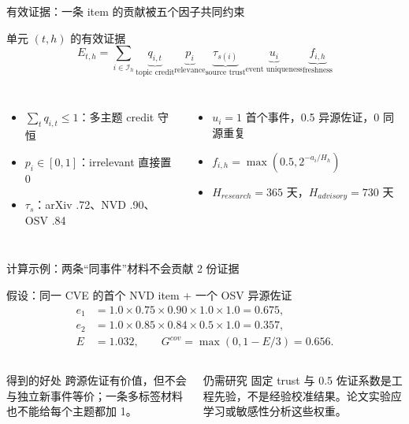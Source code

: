 \begin{frame}{有效证据：一条 item 的贡献被五个因子共同约束}
\begin{block}{单元 $(t,h)$ 的有效证据}
\[
E_{t,h}=\sum_{i\in\mathcal I_h}
\underbrace{q_{i,t}}_{\text{topic credit}}
\underbrace{p_i}_{\text{relevance}}
\underbrace{\tau_{s(i)}}_{\text{source trust}}
\underbrace{u_i}_{\text{event uniqueness}}
\underbrace{f_{i,h}}_{\text{freshness}}
\]
\end{block}
\begin{columns}[T,onlytextwidth]
\begin{itemize}
  \item $\sum_t q_{i,t}\le 1$：多主题 credit 守恒
  \item $p_i\in[0,1]$：irrelevant 直接置 0
  \item $\tau_s$：arXiv .72、NVD .90、OSV .84
\end{itemize}
\begin{itemize}
  \item $u_i=1$ 首个事件，0.5 异源佐证，0 同源重复
  \item $f_{i,h}=\max(0.5,2^{-a_i/H_h})$
  \item $H_{research}=365$ 天，$H_{advisory}=730$ 天
\end{itemize}
\end{columns}
\end{frame}

\begin{frame}{计算示例：两条“同事件”材料不会贡献 2 份证据}
\begin{block}{假设：同一 CVE 的首个 NVD item + 一个 OSV 异源佐证}
\[
\begin{aligned}
e_1 &= 1.0\times0.75\times0.90\times1.0\times1.0=0.675,\\
e_2 &= 1.0\times0.85\times0.84\times0.5\times1.0=0.357,\\
E &= 1.032,\qquad
G^{cov}=\max(0,1-E/3)=0.656.
\end{aligned}
\]
\end{block}

\begin{columns}[T,onlytextwidth]
\begin{exampleblock}{得到的好处}
跨源佐证有价值，但不会与独立新事件等价；一条多标签材料也不能给每个主题都加 1。
\end{exampleblock}
\begin{alertblock}{仍需研究}
固定 trust 与 0.5 佐证系数是工程先验，不是经验校准结果。论文实验应学习或敏感性分析这些权重。
\end{alertblock}
\end{columns}
\end{frame}


